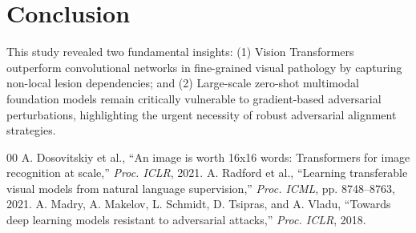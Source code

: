\documentclass[conference]{IEEEtran}
\begin{document}
\section{Conclusion}
This study revealed two fundamental insights: (1) Vision Transformers outperform convolutional networks in fine-grained visual pathology by capturing non-local lesion dependencies; and (2) Large-scale zero-shot multimodal foundation models remain critically vulnerable to gradient-based adversarial perturbations, highlighting the urgent necessity of robust adversarial alignment strategies.


\begin{thebibliography}{00}
 A. Dosovitskiy et al., ``An image is worth 16x16 words: Transformers for image recognition at scale,'' \textit{Proc. ICLR}, 2021.
 A. Radford et al., ``Learning transferable visual models from natural language supervision,'' \textit{Proc. ICML}, pp. 8748--8763, 2021.
 A. Madry, A. Makelov, L. Schmidt, D. Tsipras, and A. Vladu, ``Towards deep learning models resistant to adversarial attacks,'' \textit{Proc. ICLR}, 2018.
\end{thebibliography}
\end{document}
